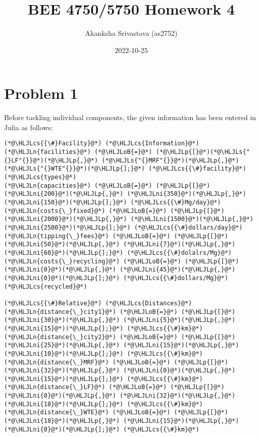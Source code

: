 \documentclass[12pt,a4paper]{article}
\title{ BEE 4750/5750 Homework 4 }
\author{ Akanksha Srivastava (as2752) }
\date{ 2022-10-25 }
\newcommand{\HLJLn}[1]{#1}
\newcommand{\HLJLs}[1]{\textcolor[RGB]{201,61,57}{#1}}
\newcommand{\HLJLni}[1]{\textcolor[RGB]{59,151,46}{#1}}
\newcommand{\HLJLoB}[1]{\textcolor[RGB]{102,102,102}{\textbf{#1}}}
\newcommand{\HLJLp}[1]{#1}
\newcommand{\HLJLcs}[1]{\textcolor[RGB]{153,153,119}{\textit{#1}}}
\begin{document}
\maketitle



\section{Problem 1}
Before tackling individual components, the given information has been entered in Julia as follows:


\begin{lstlisting}
(*@\HLJLcs{{\#}Facility}@*) (*@\HLJLcs{Information}@*)
(*@\HLJLn{facilities}@*) (*@\HLJLoB{=}@*) (*@\HLJLp{[}@*)(*@\HLJLs{"{}LF"{}}@*)(*@\HLJLp{,}@*) (*@\HLJLs{"{}MRF"{}}@*)(*@\HLJLp{,}@*) (*@\HLJLs{"{}WTE"{}}@*)(*@\HLJLp{];}@*) (*@\HLJLcs{{\#}facility}@*) (*@\HLJLcs{types}@*)
(*@\HLJLn{capacities}@*) (*@\HLJLoB{=}@*) (*@\HLJLp{[}@*)(*@\HLJLni{200}@*)(*@\HLJLp{,}@*) (*@\HLJLni{350}@*)(*@\HLJLp{,}@*) (*@\HLJLni{150}@*)(*@\HLJLp{];}@*) (*@\HLJLcs{{\#}Mg/day}@*)
(*@\HLJLn{costs{\_}fixed}@*) (*@\HLJLoB{=}@*) (*@\HLJLp{[}@*)(*@\HLJLni{2000}@*)(*@\HLJLp{,}@*) (*@\HLJLni{1500}@*)(*@\HLJLp{,}@*) (*@\HLJLni{2500}@*)(*@\HLJLp{];}@*) (*@\HLJLcs{{\#}dollars/day}@*)
(*@\HLJLn{tipping{\_}fees}@*) (*@\HLJLoB{=}@*) (*@\HLJLp{[}@*)(*@\HLJLni{50}@*)(*@\HLJLp{,}@*) (*@\HLJLni{7}@*)(*@\HLJLp{,}@*) (*@\HLJLni{60}@*)(*@\HLJLp{];}@*) (*@\HLJLcs{{\#}dolalrs/Mg}@*)
(*@\HLJLn{costs{\_}recycling}@*) (*@\HLJLoB{=}@*) (*@\HLJLp{[}@*)(*@\HLJLni{0}@*)(*@\HLJLp{,}@*) (*@\HLJLni{45}@*)(*@\HLJLp{,}@*) (*@\HLJLni{0}@*)(*@\HLJLp{];}@*) (*@\HLJLcs{{\#}dollars/Mg}@*) (*@\HLJLcs{recycled}@*)

(*@\HLJLcs{{\#}Relative}@*) (*@\HLJLcs{Distances}@*)
(*@\HLJLn{distance{\_}city1}@*) (*@\HLJLoB{=}@*) (*@\HLJLp{[}@*)(*@\HLJLni{30}@*)(*@\HLJLp{,}@*) (*@\HLJLni{5}@*)(*@\HLJLp{,}@*) (*@\HLJLni{15}@*)(*@\HLJLp{];}@*) (*@\HLJLcs{{\#}km}@*)
(*@\HLJLn{distance{\_}city2}@*) (*@\HLJLoB{=}@*) (*@\HLJLp{[}@*)(*@\HLJLni{25}@*)(*@\HLJLp{,}@*) (*@\HLJLni{15}@*)(*@\HLJLp{,}@*) (*@\HLJLni{10}@*)(*@\HLJLp{];}@*) (*@\HLJLcs{{\#}km}@*)
(*@\HLJLn{distance{\_}MRF}@*) (*@\HLJLoB{=}@*) (*@\HLJLp{[}@*)(*@\HLJLni{32}@*)(*@\HLJLp{,}@*) (*@\HLJLni{0}@*)(*@\HLJLp{,}@*) (*@\HLJLni{15}@*)(*@\HLJLp{];}@*) (*@\HLJLcs{{\#}km}@*)
(*@\HLJLn{distance{\_}LF}@*) (*@\HLJLoB{=}@*) (*@\HLJLp{[}@*)(*@\HLJLni{0}@*)(*@\HLJLp{,}@*) (*@\HLJLni{32}@*)(*@\HLJLp{,}@*) (*@\HLJLni{18}@*)(*@\HLJLp{];}@*) (*@\HLJLcs{{\#}km}@*)
(*@\HLJLn{distance{\_}WTE}@*) (*@\HLJLoB{=}@*) (*@\HLJLp{[}@*)(*@\HLJLni{18}@*)(*@\HLJLp{,}@*) (*@\HLJLni{15}@*)(*@\HLJLp{,}@*) (*@\HLJLni{0}@*)(*@\HLJLp{];}@*) (*@\HLJLcs{{\#}km}@*)


\end{lstlisting}
\end{document}
